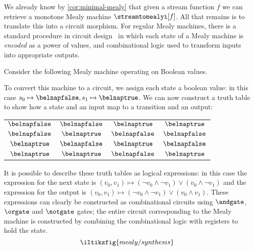 We already know by \cref{cor:minimal-mealy} that given a stream function
\(f\) we can retrieve a monotone Mealy machine \(\streamtomealyi[f]\).
All that remains is to translate this into a circuit morphism.
For regular Mealy machines, there is a standard procedure in circuit
design~\cite{kohavi2009switching} in which each state of a Mealy machine is
\emph{encoded} as a power of values, and combinational logic used to transform
inputs into appropriate outputs.

\begin{example}\label{ex:boolean-to-circuit}
    Consider the following Mealy machine operating on Boolean values.
    \begin{center}
        
    \end{center}
    \vspace{-\belowdisplayskip}
    To convert this machine to a circuit, we assign each state a boolean value:
    in this case \(s_0 \mapsto \belnapfalse, s_1 \mapsto \belnaptrue\).
    We can now construct a truth table to show how a state and an input map to
    a transition and an output:
    \begin{center}
        \begin{tabular}{cc|cc}
            \(\belnapfalse\) & \(\belnapfalse\) & \(\belnaptrue\)  & \(\belnaptrue\)  \\
            \(\belnapfalse\) & \(\belnaptrue\)  & \(\belnapfalse\) & \(\belnapfalse\) \\
            \(\belnaptrue\)  & \(\belnapfalse\) & \(\belnaptrue\)  & \(\belnapfalse\) \\
            \(\belnaptrue\)  & \(\belnaptrue\)  & \(\belnapfalse\) & \(\belnaptrue\)  \\
        \end{tabular}
    \end{center}
    It is possible to describe these truth tables as logical expressions: in
    this case the expression for the next state is \(
    (v_0, v_1)
    \mapsto
    (\neg v_0 \land \neg v_1) \lor (v_0 \land \neg v_1)
    \) and the expression for the output is \(
    (v_0, v_1)
    \mapsto
    (\neg v_0 \land \neg v_1) \lor (v_0 \land v_1)
    \).
    These expressions can clearly be constructed as combinational circuits using
    \(\andgate\), \(\orgate\) and \(\notgate\) gates; the entire circuit
    corresponding to the Mealy machine is constructed by combining the
    combinational logic with registers to hold the state.
    \[\iltikzfig{mealy/synthesis}\]
\end{example}

